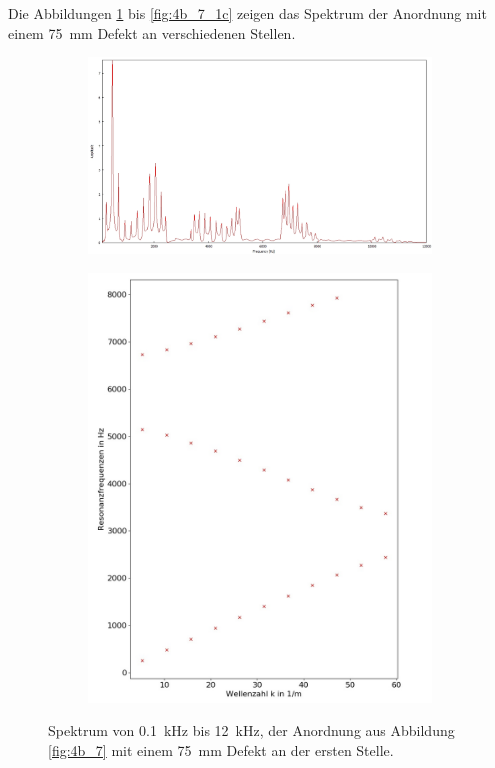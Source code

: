 Die Abbildungen \ref{fig:4b_7_1a} bis \ref{fig:4b_7_1c} zeigen das Spektrum der Anordnung mit einem 75~mm Defekt an verschiedenen Stellen.
\begin{figure}
\centering
\begin{subfigure}{0.65\textwidth}
\includegraphics[width=\textwidth]{content/messungen/Chapter4b/4b_7_1a.jpg}
\end{subfigure}
\begin{subfigure}{0.34\textwidth}
\includegraphics[width=\textwidth]{content/Scripts/4b_7_1a.jpg}
\end{subfigure}
\caption{Spektrum von 0.1~kHz bis 12~kHz, der Anordnung aus Abbildung \ref{fig:4b_7} mit einem 75~mm Defekt an der ersten Stelle.}
\label{fig:4b_7_1a}
\end{figure}
